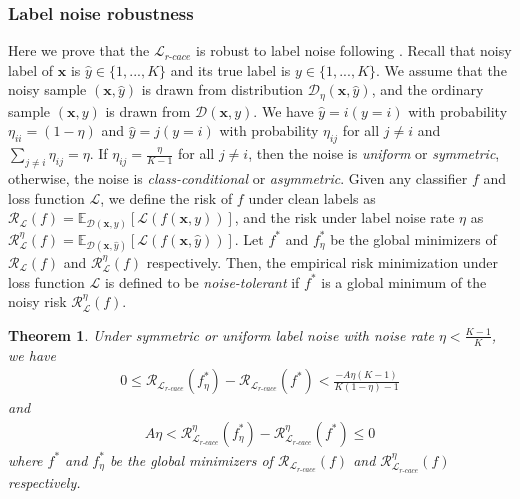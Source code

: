 \documentclass{article}
\newtheorem{theorem}{Theorem}
\begin{document}
\subsubsection{Label noise robustness}
Here we prove that the $\mathcal{L}_{r\textrm{-}cace}$ is robust to label noise following \cite{ghosh2017robust}. Recall that noisy label of $\bm{x}$ is $\hat{y} \in \{1,...,K\}$ and its true label is $y \in\{1,...,K\}$. We assume that the noisy sample $(\bm{x},\hat{y})$ is drawn from distribution $\mathcal{D}_{\eta}(\bm{x},\hat{y})$, and the ordinary sample $(\bm{x},y)$ is drawn from $\mathcal{D}(\bm{x},y)$. We have  $\hat{y} = i ( y = i)$ with probability $\eta_{ii}=(1-\eta)$ and $\hat{y}=j (y=i)$ with probability $\eta_{ij}$ for all $j\ne i$ and $\sum_{j\ne i}\eta_{ij}=\eta$. If $\eta_{ij}=\frac{\eta}{K-1}$ for all $j\ne i$, then the noise is \emph{uniform} or \emph{symmetric}, otherwise, the noise is \emph{class-conditional} or \emph{asymmetric}. Given any classifier $f$ and loss function $\mathcal{L}$, we define the risk of $f$ under clean labels as $\mathcal{R}_{\mathcal{L}}(f)=\mathbb{E}_{\mathcal{D}(\bm{x},y)}[\mathcal{L}(f(\bm{x},y))]$, and the risk under label noise rate $\eta$ as $\mathcal{R}^{\eta}_{\mathcal{L}}(f)=\mathbb{E}_{\mathcal{D}(\bm{x},\hat{y})}[\mathcal{L}(f(\bm{x},\hat{y}))]$. Let $f^{*}$ and $f^{*}_{\eta}$ be the global minimizers of $\mathcal{R}_{\mathcal{L}}(f)$ and $\mathcal{R}^{\eta}_{\mathcal{L}}(f)$ respectively. Then, the empirical risk minimization under loss function $\mathcal{L}$ is defined to be \emph{noise-tolerant} if $f^{*}$ is a global minimum of the noisy risk $\mathcal{R}^{\eta}_{\mathcal{L}}(f)$.


\begin{theorem}
	\label{theroem:1}
	Under symmetric or uniform label noise with noise rate $\eta < \frac{K-1}{K}$, we have  
	\begin{align}
		0\le \mathcal{R}_{\mathcal{L}_{r\textrm{-}cace}}(f^{*}_{\eta}) - \mathcal{R}_{\mathcal{L}_{r\textrm{-}cace}}(f^{*}) < \frac{-A\eta (K-1)}{K(1-\eta)-1} 
	\end{align}
	and 
	\begin{align}
			A\eta<\mathcal{R}^{\eta}_{\mathcal{L}_{r\textrm{-}cace}}(f^{*}_{\eta}) - \mathcal{R}^{\eta}_{\mathcal{L}_{r\textrm{-}cace}}(f^{*}) \le 0 
	\end{align}
	where $f^{*}$ and $f^{*}_{\eta}$ be the global minimizers of $\mathcal{R}_{\mathcal{L}_{r\textrm{-}cace}}(f)$ and $\mathcal{R}^{\eta}_{\mathcal{L}_{r\textrm{-}cace}}(f)$ respectively.
\end{theorem}
\end{document}

